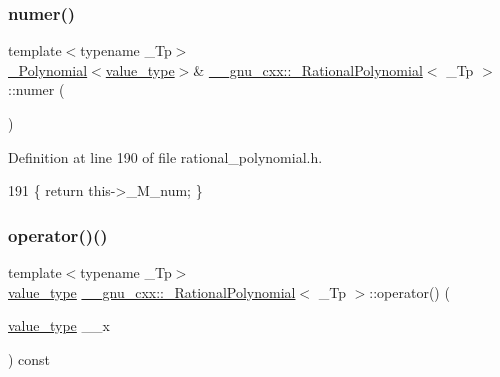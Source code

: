 \subsubsection{\texorpdfstring{numer()}{numer()}\hspace{0.1cm}{\footnotesize\ttfamily [2/2]}}
{\footnotesize\ttfamily template$<$typename \+\_\+\+Tp$>$ \\
\hyperlink{class____gnu__cxx_1_1__Polynomial}{\+\_\+\+Polynomial}$<$\hyperlink{class____gnu__cxx_1_1__RationalPolynomial_adeec7f1bec03111031599f337848ee8b}{value\+\_\+type}$>$\& \hyperlink{class____gnu__cxx_1_1__RationalPolynomial}{\+\_\+\+\_\+gnu\+\_\+cxx\+::\+\_\+\+Rational\+Polynomial}$<$ \+\_\+\+Tp $>$\+::numer (\begin{DoxyParamCaption}{ }\end{DoxyParamCaption})\hspace{0.3cm}{\ttfamily [inline]}}



Definition at line 190 of file rational\+\_\+polynomial.\+h.


\begin{DoxyCode}
191       \{ \textcolor{keywordflow}{return} this->\_M\_num; \}
\end{DoxyCode}
\mbox{\label{class____gnu__cxx_1_1__RationalPolynomial_a964bc37a8932003c8ecd45da84512b2d}} 
\subsubsection{\texorpdfstring{operator()()}{operator()()}}
{\footnotesize\ttfamily template$<$typename \+\_\+\+Tp$>$ \\
\hyperlink{class____gnu__cxx_1_1__RationalPolynomial_adeec7f1bec03111031599f337848ee8b}{value\+\_\+type} \hyperlink{class____gnu__cxx_1_1__RationalPolynomial}{\+\_\+\+\_\+gnu\+\_\+cxx\+::\+\_\+\+Rational\+Polynomial}$<$ \+\_\+\+Tp $>$\+::operator() (\begin{DoxyParamCaption}\item[{\hyperlink{class____gnu__cxx_1_1__RationalPolynomial_adeec7f1bec03111031599f337848ee8b}{value\+\_\+type}}]{\+\_\+\+\_\+x }\end{DoxyParamCaption}) const\hspace{0.3cm}{\ttfamily [inline]}}

